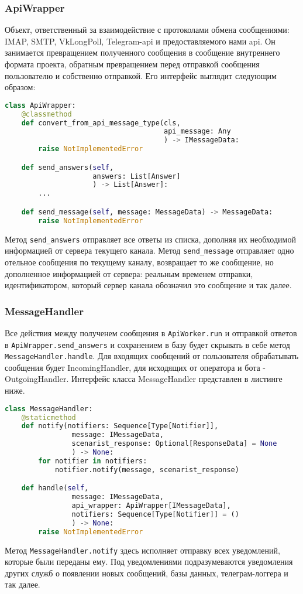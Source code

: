     \subsubsection*{ApiWrapper}
    Объект, ответственный за взаимодействие с протоколами обмена сообщениями: IMAP, SMTP, VkLongPoll,
    Telegram-api и предоставляемого нами api.
    Он занимается превращением полученного сообщения в сообщение внутреннего формата проекта,
    обратным превращением перед отправкой сообщения пользователю и собственно отправкой.
    Его интерфейс выглядит следующим образом:
\begin{lstlisting}[language=Python]
class ApiWrapper:
    @classmethod
    def convert_from_api_message_type(cls,
                                      api_message: Any
                                      ) -> IMessageData:
        raise NotImplementedError

    def send_answers(self,
                     answers: List[Answer]
                     ) -> List[Answer]:
        ...

    def send_message(self, message: MessageData) -> MessageData:
        raise NotImplementedError
\end{lstlisting}
    Метод \lstinline{send_answers} отправляет все ответы из списка, дополняя их
    необходимой информацией от сервера текущего канала. 
    Метод \lstinline{send_message} отправляет одно отельное сообщения по текущему каналу,
    возвращает то же сообщение, но дополненное информацией от сервера: реальным временем
    отправки, идентификатором, который сервер канала обозначил это сообщение и так далее.

    \subsubsection*{MessageHandler}
    Все действия между полученем сообщения в \lstinline{ApiWorker.run} и отправкой ответов
    в \lstinline{ApiWrapper.send_answers} и сохранением в базу будет скрывать в себе метод
    \lstinline{MessageHandler.handle}. Для входящих сообщений от пользователя обрабатывать
    сообщения будет IncomingHandler, для исходящих от оператора и бота - OutgoingHandler.
    Интерфейс класса MessageHandler представлен в листинге ниже.
\begin{lstlisting}[language=Python]
class MessageHandler:
    @staticmethod
    def notify(notifiers: Sequence[Type[Notifier]],
                message: IMessageData,
                scenarist_response: Optional[ResponseData] = None
                ) -> None:
        for notifier in notifiers:
            notifier.notify(message, scenarist_response)

    def handle(self,
                message: IMessageData,
                api_wrapper: ApiWrapper[IMessageData],
                notifiers: Sequence[Type[Notifier]] = ()
                ) -> None:
        raise NotImplementedError
\end{lstlisting}
    Метод \lstinline{MessageHandler.notify} здесь исполняет отправку всех уведомлений,
    которые были переданы ему. Под уведомлениями подразумеваются уведомления других служб
    о появлении новых сообщений, базы данных, телеграм-логгера и так далее.


